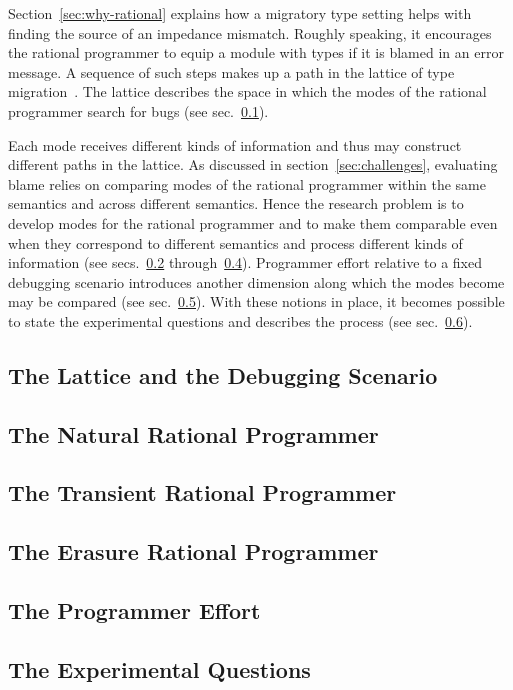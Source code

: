 
Section~\ref{sec:why-rational} explains how a migratory type setting helps with
finding the source of an impedance mismatch. Roughly speaking, it encourages the
rational programmer to equip a module with types if it is blamed in an error
message. A sequence of such steps makes up a path in the
lattice of type migration~\citep{tfgnvf-popl-2016}. The lattice describes the
space in which the modes of the rational programmer search for bugs (see
sec.~\ref{sub:stuff}).

Each mode receives different kinds of information and thus may construct
different paths in the lattice. As discussed in section~\ref{sec:challenges},
evaluating blame relies on comparing modes of the rational programmer
within the same semantics and across different semantics.  
Hence the research problem is to develop modes for the rational programmer and to make
them comparable even when they correspond to different semantics and process
different kinds of information (see secs.~\ref{sub:natural}
through~\ref{sub:erasure}). Programmer effort relative to a fixed debugging
scenario introduces another dimension along which the modes become may be
compared (see sec.~\ref{sub:effort}). With these notions in place, it
becomes possible to state the experimental questions and describes the process (see sec.~\ref{sub:experiment}).

\def\rsub#1#2{\subsection{#2} \label{sub:#1} }

\rsub{stuff}     {The Lattice and the Debugging Scenario} 
\rsub{natural}   {The Natural Rational Programmer} 
\rsub{transient} {The Transient Rational Programmer} 
\rsub{erasure}   {The Erasure Rational Programmer} 
\rsub{effort}    {The Programmer Effort} \label{subsec:effort}
\rsub{experiment}{The Experimental Questions} 

